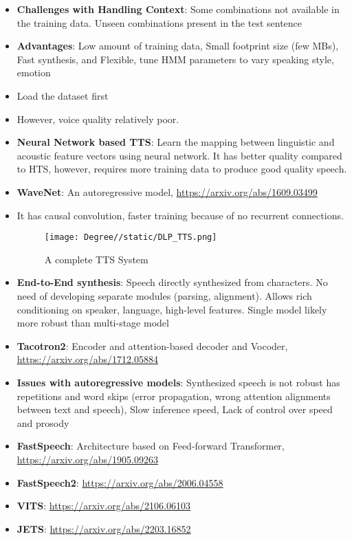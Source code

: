 \documentclass[a4paper]{article}
\begin{document}
\begin{itemize}
    \item \textbf{Challenges with Handling Context}: Some combinations not available in the training data. Unseen combinations present in the test sentence
    \item \textbf{Advantages}: Low amount of training data, Small footprint size (few MBs), Fast synthesis, and Flexible, tune HMM parameters to vary speaking style, emotion
    \item Load the dataset first
    \item However, voice quality relatively poor.
    \item \textbf{Neural Network based TTS}: Learn the mapping between linguistic and acoustic feature vectors using neural network. It has better quality compared to HTS, however, requires more training data to produce good quality speech.
    \item \textbf{WaveNet}: An autoregressive model, \url{https://arxiv.org/abs/1609.03499}
    \item It has causal convolution, faster training because of no recurrent connections.
    \begin{figure}[H]
        \centering
        \texttt{[image: Degree//static/DLP\_TTS.png]}
        \caption{A complete TTS System}
    \end{figure}
    \item \textbf{End-to-End synthesis}: Speech directly synthesized from characters. No need of developing separate modules (parsing, alignment). Allows rich conditioning on speaker, language, high-level features. Single model likely more robust than multi-stage model
    \item \textbf{Tacotron2}: Encoder and attention-based decoder and Vocoder, \url{https://arxiv.org/abs/1712.05884}
    \item \textbf{Issues with autoregressive models}: Synthesized speech is not robust has repetitions and word skips (error propagation, wrong attention alignments between text and speech), Slow inference speed, Lack of control over speed and prosody
    \item \textbf{FastSpeech}: Architecture based on Feed-forward Transformer, \url{https://arxiv.org/abs/1905.09263}
    \item \textbf{FastSpeech2}: \url{https://arxiv.org/abs/2006.04558}
    \item \textbf{VITS}: \url{https://arxiv.org/abs/2106.06103}
    \item \textbf{JETS}: \url{https://arxiv.org/abs/2203.16852}

\end{itemize}
\end{document}
